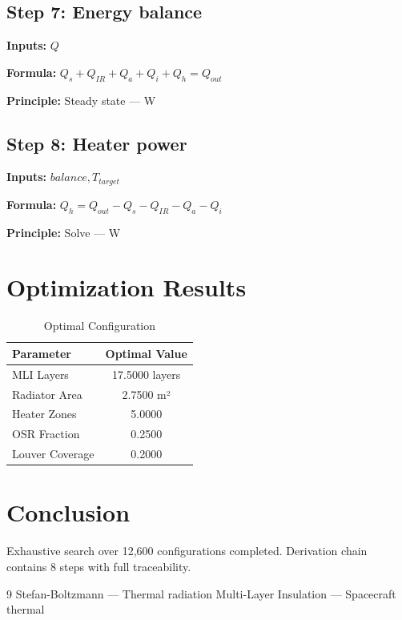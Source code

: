 \documentclass[11pt,twocolumn]{article}
\begin{document}
\subsection*{Step 7: Energy balance}
\textbf{Inputs:} $Q$

\textbf{Formula:} $Q_s + Q_{IR} + Q_a + Q_i + Q_h = Q_{out}$

\textbf{Principle:} Steady state --- W

\subsection*{Step 8: Heater power}
\textbf{Inputs:} $balance, T_{target}$

\textbf{Formula:} $Q_h = Q_{out} - Q_s - Q_{IR} - Q_a - Q_i$

\textbf{Principle:} Solve --- W


\section{Optimization Results}
\begin{table}[h]
\centering
\caption{Optimal Configuration}
\begin{tabular}{@{}lc@{}}
\toprule
Parameter & Optimal Value \\
\midrule
MLI Layers & 17.5000 layers \\
Radiator Area & 2.7500 m² \\
Heater Zones & 5.0000  \\
OSR Fraction & 0.2500  \\
Louver Coverage & 0.2000  \\
\bottomrule
\end{tabular}
\end{table}

\section{Conclusion}
Exhaustive search over 12,600 configurations completed.
Derivation chain contains 8 steps with full traceability.

\begin{thebibliography}{9}
 Stefan-Boltzmann --- Thermal radiation
 Multi-Layer Insulation --- Spacecraft thermal
\end{thebibliography}
\end{document}
